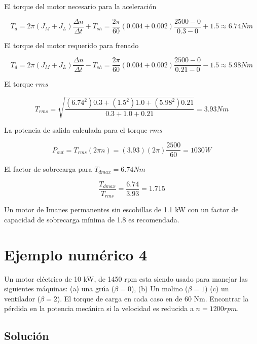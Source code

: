 \documentclass[12pt]{book}
\theoremstyle{definition}
\theoremstyle{remark}
\theoremstyle{plain}
\begin{document}
El torque del motor necesario para la aceleración

\begin{equation*}
T_d = 2 \pi (J_M +J_L) \frac{\Delta n}{\Delta t}+T_{sh}=\frac{2 \pi}{60}(0.004+0.002) \frac{2500-0}{0.3-0}+1.5 \approx 6.74  Nm
\end{equation*}

El torque del motor requerido para frenado

\begin{equation*}
T_d = 2 \pi (J_M +J_L) \frac{\Delta n}{\Delta t}-T_{sh}=\frac{2 \pi}{60}(0.004+0.002) \frac{2500-0}{0.21-0}-1.5 \approx 5.98 Nm
\end{equation*}

El torque $rms$

\begin{equation*}
T_{rms}= \sqrt{\frac{(6.74^2)0.3+(1.5^2)1.0+(5.98^2)0.21 }{0.3+1.0+0.21 }} = 3.93 Nm
\end{equation*}

La potencia de salida calculada para el torque  $rms$

\begin{equation*}
P_{out}= T_{rms}(2 \pi n) = (3.93)(2 \pi) \frac{2500}{60} = 1030 W
\end{equation*}

El factor de sobrecarga para $T_{dmax}=6.74 Nm$

\begin{equation*}
\frac{T_{dmax}}{T_{rms}}= \frac{6.74}{3.93}=1.715
\end{equation*} 

Un motor de Imanes permanentes sin escobillas de 1.1 kW con un factor de capacidad de sobrecarga mínima de 1.8 es recomendada.

\section{Ejemplo numérico 4}

Un motor eléctrico de 10 kW, de 1450 rpm esta siendo usado para manejar las siguientes máquinas: (a) una grúa ($\beta =0$), (b) Un molino ($\beta = 1$) (c) un ventilador ($\beta =2$).  El torque de carga en cada caso en de 60 Nm. Encontrar la pérdida en la potencia mecánica si la velocidad es reducida a $n= 1200 rpm$.

\subsection{Solución}
\end{document}
